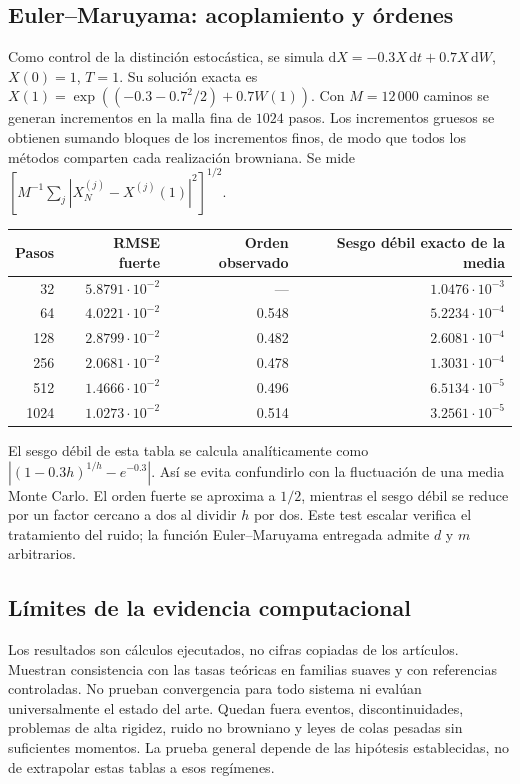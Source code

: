 \documentclass[11pt,a4paper]{article}
\theoremstyle{definition}\newtheorem{definition}[theorem]{Definición}
\theoremstyle{remark}\newtheorem{remark}[theorem]{Observación}
\begin{document}
\clearpage
\subsection{Euler--Maruyama: acoplamiento y órdenes}
Como control de la distinción estocástica, se simula
$\mathrm dX=-0.3X\,\mathrm dt+0.7X\,\mathrm dW$, $X(0)=1$, $T=1$.
Su solución exacta es $X(1)=\exp((-0.3-0.7^2/2)+0.7W(1))$.
Con $M=12\,000$ caminos se generan incrementos en la malla fina de
$1024$ pasos. Los incrementos gruesos se obtienen sumando bloques de los
incrementos finos, de modo que todos los métodos comparten cada realización
browniana. Se mide $[M^{-1}\sum_j|X_N^{(j)}-X^{(j)}(1)|^2]^{1/2}$.
\begin{center}\small
\begin{tabular}{@{}rrrr@{}}\toprule
Pasos & RMSE fuerte & Orden observado & Sesgo débil exacto de la media\\\midrule
32 & $5.8791\cdot10^{-2}$ & --- & $1.0476\cdot10^{-3}$\\
64 & $4.0221\cdot10^{-2}$ & 0.548 & $5.2234\cdot10^{-4}$\\
128 & $2.8799\cdot10^{-2}$ & 0.482 & $2.6081\cdot10^{-4}$\\
256 & $2.0681\cdot10^{-2}$ & 0.478 & $1.3031\cdot10^{-4}$\\
512 & $1.4666\cdot10^{-2}$ & 0.496 & $6.5134\cdot10^{-5}$\\
1024 & $1.0273\cdot10^{-2}$ & 0.514 & $3.2561\cdot10^{-5}$\\\bottomrule
\end{tabular}\end{center}
El sesgo débil de esta tabla se calcula analíticamente como
$|(1-0.3h)^{1/h}-e^{-0.3}|$. Así se evita confundirlo con la fluctuación
de una media Monte Carlo. El orden fuerte se aproxima a $1/2$, mientras
el sesgo débil se reduce por un factor cercano a dos al dividir $h$ por dos.
Este test escalar verifica el tratamiento del ruido; la función
Euler--Maruyama entregada admite $d$ y $m$ arbitrarios.

\subsection{Límites de la evidencia computacional}
Los resultados son cálculos ejecutados, no cifras copiadas de los artículos.
Muestran consistencia con las tasas teóricas en familias suaves y con
referencias controladas. No prueban convergencia para todo sistema ni
evalúan universalmente el estado del arte. Quedan fuera eventos,
discontinuidades, problemas de alta rigidez, ruido no browniano y leyes de
colas pesadas sin suficientes momentos. La prueba general depende de las
hipótesis establecidas, no de extrapolar estas tablas a esos regímenes.
\end{document}
